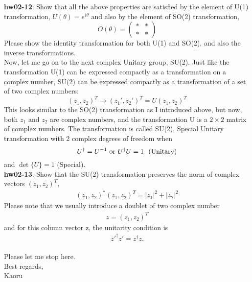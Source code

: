 \documentclass[12pt]{article}
\begin{document}
{\bf hw02-12}: Show that all the above properties are satisfied
by the element of U(1) transformation,
$U(\theta) = e^{i\theta}$
and also by the element of SO(2) transformation,
\begin{equation}
O(\theta) =
\begin{pmatrix}
  *&*\\
  *&*
\end{pmatrix}
\end{equation}
Please show the identity transformation for both U(1)
and SO(2), and also the inverse transformations.\\

Now, let me go on to the next complex Unitary group,
SU(2). Just like the transformation U(1) can be
expressed compactly as a transformation on a complex
number, SU(2) can be expressed compactly as a transformation
of a set of two complex numbers:
\begin{equation}
  \label{eq:10}
  (z_1, z_2)^T \to (z_1',z_2')^T = U (z_1,z_2)^T
\end{equation}
This looks similar to the SO(2) transformation as I
introduced above, but now, both $z_1$ and $z_2$ are complex
numbers, and the transformation U is a $2\times 2$ matrix
of complex numbers.  The transformation is called
SU(2), Special Unitary transformation with 2 complex
degrees of freedom when
\begin{equation}
  \label{eq:11}
U^\dagger = U^{-1}~\text{or} ~ U^\dagger U = 1 ~~\rm (Unitary)  
\end{equation}
and
$\det{\{U\}} = 1$ (Special).\\

{\bf hw02-13}: Show that the SU(2) transformation preserves
the norm of complex vectors $(z_1,z_2)^T$,
\begin{eqnarray}
(z_1,z_2)^* (z_1,z_2)^T = |z_1|^2 + |z_2|^2
\end{eqnarray}
Please note that we usually introduce a doublet of
two complex number
\begin{eqnarray}
z = (z_1,z_2)^T
\end{eqnarray}
and for this column vector z, the unitarity condition is
\begin{eqnarray}
z'^\dagger z' = z^\dagger z.
\end{eqnarray}\\


Please let me stop here.\\

Best regards,\\

Kaoru
\end{document}

